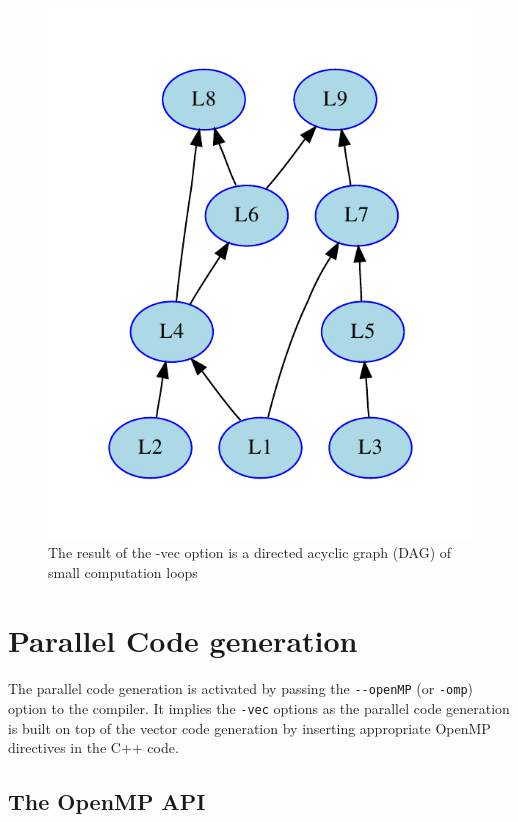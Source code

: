 \documentclass[a4paper]{book}
\begin{document}
\begin{figure}[htb]
  \centering
  \includegraphics[scale=0.75]{graphs/loopgraph2}
  \caption{The result of the -vec option is a directed acyclic graph (DAG) of small computation loops}   
  \label{fig:loopgraph}
\end{figure}


\section{Parallel Code generation}

The parallel code generation is activated by passing the \lstinline!--openMP! (or \lstinline!-omp!) option to the \faust compiler. It implies the \lstinline!-vec! options as the parallel code generation is built on top of the vector code generation by inserting appropriate OpenMP directives in the C++ code.  

\subsection{The OpenMP API}
\end{document}
